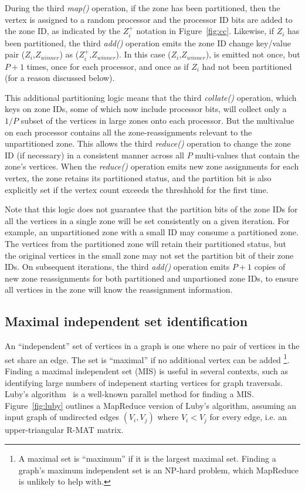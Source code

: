 During the third {\it map()} operation, if the zone has been
partitioned, then the vertex is assigned to a random processor and the
processor ID bits are added to the zone ID, as indicated by the
$Z_i^+$ notation in Figure~\ref{fig:cc}.  Likewise, if $Z_i$ has been
partitioned, the third {\it add()} operation emits the zone ID change
key/value pair ($Z_i$,$Z_{winner}$) as ($Z_i^+$,$Z_{winner}$).  In
this case ($Z_i$,$Z_{winner}$), is emitted not once, but $P+1$ times,
once for each processor, and once as if $Z_i$ had not been partitioned
(for a reason discussed below).

This additional partitioning logic means that the third {\it
collate()} operation, which keys on zone IDs, some of which now
include processor bits, will collect only a $1/P$ subset of the
vertices in large zones onto each processor.  But the multivalue on
each processor contains all the zone-reassignments relevant to the
unpartitioned zone.  This allows the third {\it reduce()} operation to
change the zone ID (if necessary) in a consistent manner across all
$P$ multi-values that contain the zone's vertices.  When the {\it
reduce()} operation emits new zone assignments for each vertex, the
zone retains its partitioned status, and the partition bit is also
explicitly set if the vertex count exceeds the threshhold for the
first time.

Note that this logic does not guarantee that the partition bits of the
zone IDs for all the vertices in a single zone will be set
consistently on a given iteration.  For example, an unpartitioned zone
with a small ID may consume a partitioned zone.  The vertices from the
partitioned zone will retain their partitioned status, but the
original vertices in the small zone may not set the partition bit of
their zone IDs.  On subsequent iterations, the third {\it add()}
operation emits $P+1$ copies of new zone reassignments for both
partitioned and unpartioned zone IDs, to ensure all vertices in the
zone will know the reassignment information.

\subsection{Maximal independent set identification}

An ``independent'' set of vertices in a graph is one where no pair of
vertices in the set share an edge.  The set is ``maximal'' if no
additional vertex can be added \footnote{A maximal set is ``maximum''
if it is the largest maximal set.  Finding a graph's maximum
independent set is an NP-hard problem, which MapReduce is unlikely to
help with.}.  Finding a maximal independent set (MIS) is useful in
several contexts, such as identifying large numbers of indepenent
starting vertices for graph traversals.  Luby's algorithm~\cite{Luby86}
is a well-known parallel method for finding a MIS.  Figure~\ref{fig:luby} 
outlines a MapReduce version of Luby's algorithm,
assuming an input graph of undirected edges $(V_i,V_j)$ where $V_i <
V_j$ for every edge, i.e. an upper-triangular R-MAT matrix.

